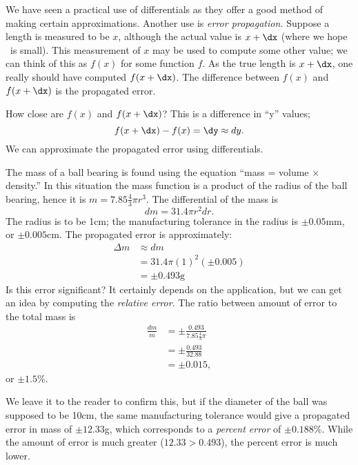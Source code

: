 We have seen a practical use of differentials as they offer a good method of making certain approximations. Another use is \textit{error propagation.} Suppose a length is measured to be $x$, although the actual value is $x+\dx$ (where we hope \dx\ is small). This measurement of $x$ may be used to compute some other value; we can think of this as $f(x)$ for some function $f$. As the true length is $x+\dx$, one really should have computed $f(x+\dx)$. The difference between $f(x)$ and $f(x+\dx)$ is the propagated error. 

How close are $f(x)$ and $f(x+\dx)$? This is a difference in ``y'' values; $$f(x+\dx)-f(x) = \dy \approx dy.$$ We can approximate the propagated error using differentials.\\

{The mass of a ball bearing is found using the equation ``mass = volume $\times$ density.'' In this situation the mass function is a product of the radius of the ball bearing, hence it is $m = 7.85\frac43\pi r^3$. The differential of the mass is $$dm = 31.4\pi r^2 dr.$$ The radius is to be 1cm; the manufacturing tolerance in the radius is $\pm 0.05$mm, or $\pm 0.005$cm. The propagated error is approximately:
\begin{align*}
\Delta m & \approx dm \\
				&= 31.4\pi (1)^2 (\pm 0.005) \\
				&= \pm 0.493\text{g}
\end{align*}
Is this error significant? It certainly depends on the application, but we can get an idea by computing the \textit{relative error}. The ratio between amount of error to the total mass is
\begin{align*}
\frac{dm}{m} &= \pm \frac{0.493}{7.85\frac43\pi} \\
							&=\pm \frac{0.493}{32.88}\\
							&=\pm 0.015,
\end{align*}
or $\pm 1.5$\%. 


We leave it to the reader to confirm this, but if the diameter of the ball was supposed to be 10cm, the same manufacturing tolerance would give a propagated error in mass of $\pm12.33$g, which corresponds to a \textit{percent error} of $\pm0.188$\%. While the amount of error is much greater ($12.33 > 0.493$), the percent error is much lower.}


